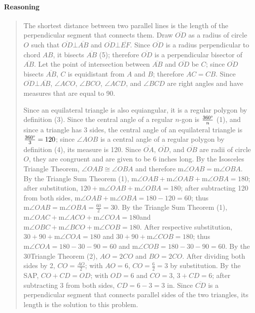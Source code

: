 \documentclass[letterpaper,12pt,twoside]{report}
\begin{document}
	\paragraph{Reasoning}
	\begin{quotation}
	
	The shortest distance between two parallel lines is the length of the perpendicular segment that connects them. Draw $\overline{OD}$ as a radius of circle $O$ such that $\overline{OD}\bot\overline{AB}$ and $\overline{OD}\bot\overline{EF}$. Since $\overline{OD}$ is a radius perpendicular to chord $AB$, it bisects $\overline{AB}$ (5); therefore $\overline{OD}$ is a perpendicular bisector of $\overline{AB}$. Let the point of intersection between $\overline{AB}$ and $\overline{OD}$ be $C$; since $\overline{OD}$ bisects $\overline{AB}$, $C$ is equidistant from $A$ and $B$; therefore $AC=CB$. Since $\overline{OD}\bot\overline{AB}$, $\angle ACO$, $\angle BCO$, $\angle ACD$, and $\angle BCD$ are right angles and have measures that are equal to 90\textdegree.
	
	Since an equilateral triangle is also equiangular, it is a regular polygon by definition (3). Since the central angle of a regular $n$-gon is $\frac{360\text{\textdegree}}{n}$ (1), and since a triangle has 3 sides, the central angle of an equilateral triangle is $\frac{360\text{\textdegree}}{3}=120$\textdegree; since $\angle AOB$ is a central angle of a regular polygon by definition (4), its measure is 120\textdegree. Since $\overline{OA}$, $\overline{OD}$, and $\overline{OB}$ are radii of circle $O$, they are congruent and are given to be 6 inches long. By the Isosceles Triangle Theorem, $\angle OAB\cong\angle OBA$ and therefore $\text{m}\angle OAB=\text{m}\angle OBA$. By the Triangle Sum Theorem (1), $\text{m}\angle OAB+\text{m}\angle OAB+\text{m}\angle OBA=180$\textdegree; after substitution, $120+\text{m}\angle OAB+\text{m}\angle OBA=180$; after subtracting 120 from both sides, $\text{m}\angle OAB+\text{m}\angle OBA=180-120=60$; thus $\text{m}\angle OAB=\text{m}\angle OBA=\frac{60}{2}=30$. By the Triangle Sum Theorem (1), $\text{m}\angle OAC+\text{m}\angle ACO+\text{m}\angle COA=180$\textdegree and $\text{m}\angle OBC+\text{m}\angle BCO+\text{m}\angle COB=180$\textdegree. After respective substitution, $30+90+\text{m}\angle COA=180$ and $30+90+\text{m}\angle COB=180$; thus $\text{m}\angle COA=180-30-90=60$ and $\text{m}\angle COB=180-30-90=60$. By the 30\textdegree \space Triangle Theorem (2), $AO=2CO$ and $BO=2CO$. After dividing both sides by 2, $CO=\frac{AO}{2}$; with $AO=6$, $CO=\frac{6}{2}=3$ by substitution. By the SAP, $CO+CD=OD$; with $OD=6$ and $CO=3$, $3+CD=6$; after subtracting 3 from both sides, $CD=6-3=\boxed{3 \text{  in}}$. Since $\overline{CD}$ is a perpendicular segment that connects parallel sides of the two triangles, its length is the solution to this problem.
	\end{quotation}
	
\end{document}
